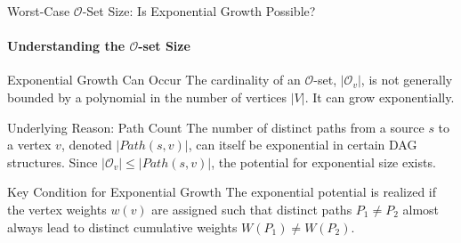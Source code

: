 \documentclass{beamer}
\begin{document}



\backmatter

\begin{frame}[noframenumbering]{Worst-Case $\mathcal{O}$-Set Size: Is Exponential Growth Possible?}
    \framesubtitle{Understanding the $\mathcal{O}$-set Size}

    \begin{block}{Exponential Growth Can Occur}
        The cardinality of an $\mathcal{O}$-set, $|\mathcal{O}_v|$, is not generally bounded by a polynomial in the number of vertices $|V|$. It can grow exponentially.
    \end{block}

    \begin{block}{Underlying Reason: Path Count}
        The number of distinct paths from a source $s$ to a vertex $v$, denoted $|Path(s, v)|$, can itself be exponential in certain DAG structures. Since $|\mathcal{O}_v| \le |Path(s, v)|$, the potential for exponential size exists.
    \end{block}

    \pause %

    \begin{alertblock}{Key Condition for Exponential Growth}
        The exponential potential is realized if the vertex weights $w(v)$ are assigned such that distinct paths $P_1 \neq P_2$ almost always lead to distinct cumulative weights $W(P_1) \neq W(P_2)$.
    \end{alertblock}

\end{frame}
\end{document}
